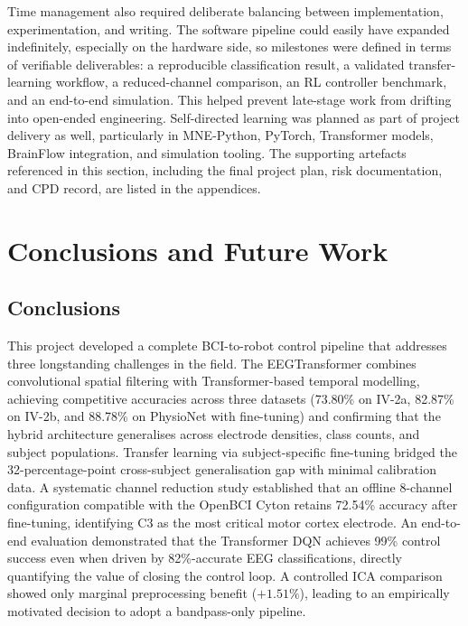 \documentclass[12pt, a4paper]{article}
\begin{document}
Time management also required deliberate balancing between implementation, experimentation, and writing. The software pipeline could easily have expanded indefinitely, especially on the hardware side, so milestones were defined in terms of verifiable deliverables: a reproducible classification result, a validated transfer-learning workflow, a reduced-channel comparison, an RL controller benchmark, and an end-to-end simulation. This helped prevent late-stage work from drifting into open-ended engineering. Self-directed learning was planned as part of project delivery as well, particularly in MNE-Python, PyTorch, Transformer models, BrainFlow integration, and simulation tooling. The supporting artefacts referenced in this section, including the final project plan, risk documentation, and CPD record, are listed in the appendices.

\section{Conclusions and Future Work}

\subsection{Conclusions}

This project developed a complete BCI-to-robot control pipeline that addresses three longstanding challenges in the field. The EEGTransformer combines convolutional spatial filtering with Transformer-based temporal modelling, achieving competitive accuracies across three datasets (73.80\% on IV-2a, 82.87\% on IV-2b, and 88.78\% on PhysioNet with fine-tuning) and confirming that the hybrid architecture generalises across electrode densities, class counts, and subject populations. Transfer learning via subject-specific fine-tuning bridged the 32-percentage-point cross-subject generalisation gap with minimal calibration data. A systematic channel reduction study established that an offline 8-channel configuration compatible with the OpenBCI Cyton retains 72.54\% accuracy after fine-tuning, identifying C3 as the most critical motor cortex electrode. An end-to-end evaluation demonstrated that the Transformer DQN achieves 99\% control success even when driven by 82\%-accurate EEG classifications, directly quantifying the value of closing the control loop. A controlled ICA comparison showed only marginal preprocessing benefit ($+1.51\%$), leading to an empirically motivated decision to adopt a bandpass-only pipeline.
\end{document}
